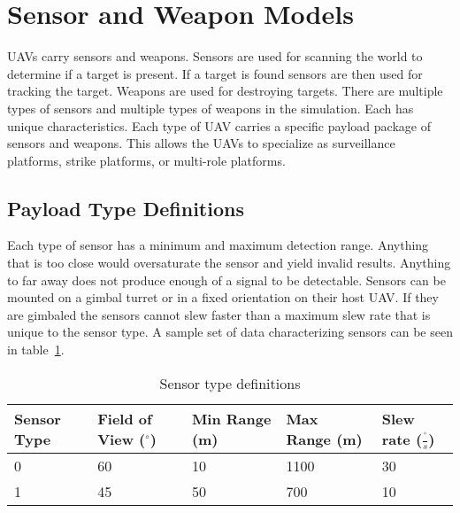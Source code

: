 \section{Sensor and Weapon Models}

UAVs carry sensors and weapons.  Sensors are used for scanning the world to determine if a target is present.  If a target is found sensors are then used for tracking the target.  Weapons are used for destroying targets.  There are multiple types of sensors and multiple types of weapons in the simulation.  Each has unique characteristics.  Each type of UAV carries a specific payload package of sensors and weapons.  This allows the UAVs to specialize as surveillance platforms, strike platforms, or multi-role platforms.

\subsection{Payload Type Definitions}

Each type of sensor has a minimum and maximum detection range.  Anything that is too close would oversaturate the sensor and yield invalid results.  Anything to far away does not produce enough of a signal to be detectable.  Sensors can be mounted on a gimbal turret or in a fixed orientation on their host UAV.  If they are gimbaled the sensors cannot slew faster than a maximum slew rate that is unique to the sensor type. A sample set of data characterizing sensors can be seen in table~\ref{tab:sensorType}.

\begin{table}[H]
	\caption{Sensor type definitions}
	\centering
	\label{tab:sensorType}
	\begin{tabular}{|p{1cm}|p{1.5cm}|p{1cm}|p{1cm}|p{1.5cm}|}
		\hline
		Sensor Type & Field of View ($^{\circ}$) & Min Range (m) & Max Range (m) & Slew rate ($\frac{^{\circ}}{s}$)\\ \hline
		0 & 60 & 10 & 1100 & 30 \\
		1 & 45 & 50 & 700  & 10 \\
		\hline
	\end{tabular}
\end{table}

